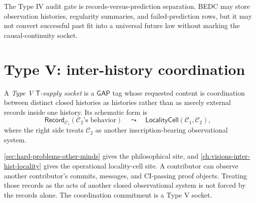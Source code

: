 \begin{remark}
\label{rem:transcendental-supply-type-IV-gate}
The Type IV audit gate is records-versus-prediction separation. BEDC may store observation histories, regularity summaries, and failed-prediction rows, but it may not convert successful past fit into a universal future law without marking the causal-continuity socket.
\end{remark}


\section{Type V: inter-history coordination}
\label{sec:transcendental-supply-type-V}

\begin{definition}
\label{def:transcendental-supply-type-V}
A \emph{Type V $\mathsf{T}$-supply socket} is a $\mathsf{GAP}$ tag whose requested content is coordination between distinct closed histories as histories rather than as merely external records inside one history. Its schematic form is
$$
\mathsf{Record}_{\mathcal{C}_1}(\mathcal{C}_2\text{'s behavior})
\quad\leadsto\quad
\mathsf{LocalityCell}(\mathcal{C}_1,\mathcal{C}_2),
$$
where the right side treats $\mathcal{C}_2$ as another inscription-bearing observational system.
\end{definition}

\begin{example}
\label{ex:transcendental-supply-type-V-engineering}
\autoref{sec:hard-problems-other-minds} gives the philosophical site, and \autoref{ch:visions-inter-hist-locality} gives the operational locality-cell site. A contributor can observe another contributor's commits, messages, and CI-passing proof objects. Treating those records as the acts of another closed observational system is not forced by the records alone. The coordination commitment is a Type V socket.
\end{example}

